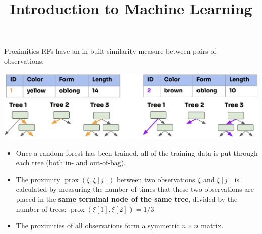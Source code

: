 \documentclass[11pt,compress,t,notes=noshow, xcolor=table]{beamer}
\title{Introduction to Machine Learning}
\begin{document}

\begin{vbframe}{Proximities}
RFs have an in-built similarity measure between pairs of observations: 

\begin{center}
\includegraphics[width=1\textwidth]{figure_man/forest-proximities.png}
\end{center}

\begin{itemize}
  \item Once a random forest has been trained, all of the training data is put through each tree (both in- and out-of-bag).
  \item The proximity $\operatorname{prox}\left(\xi, \xi[j]\right)$
  between two observations $\xi$ and $\xi[j]$ is calculated by measuring the number of times that these two observations are placed in the \textbf{same terminal node of the same tree}, divided by the number of trees: $\operatorname{prox}\left(\xi[1], \xi[2]\right) = 1/3$
  \item The proximities of all observations form a symmetric $n \times n$ matrix.
\end{itemize}

\end{vbframe}
\end{document}
